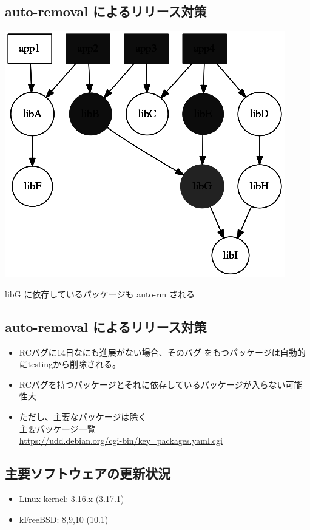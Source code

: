 \documentclass[mingoth,a4paper]{jsarticle}
\begin{document}
\subsection{auto-removal によるリリース対策}
\begin{center}
\includegraphics[scale=0.4]{image201410/auto-rm3_mono.png}

libG に依存しているパッケージも auto-rm される
\end{center}


\subsection{auto-removal によるリリース対策}
\begin{itemize}
\item RCバグに14日なにも進展がない場合、そのバグ
をもつパッケージは自動的にtestingから削除される。
\item RCバグを持つパッケージとそれに依存しているパッケージが入らない可能性大
\item ただし、主要なパッケージは除く \\
主要パッケージ一覧\\
\url{https://udd.debian.org/cgi-bin/key_packages.yaml.cgi}
\end{itemize}


\subsection{主要ソフトウェアの更新状況}

\begin{itemize}
\item Linux kernel: 3.16.x (3.17.1)
\item kFreeBSD: 8,9,10 (10.1)
\end{itemize}
\end{document}
